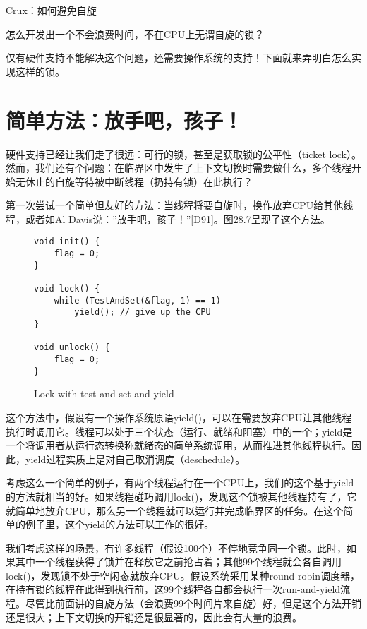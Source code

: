 \begin{tcolorbox}[colframe=grey,colback= grey,arc=0pt,left=6pt,right=6pt,top=6pt,bottom=6pt,boxsep=0pt]
\begin{center}Crux：如何避免自旋\end{center}
怎么开发出一个不会浪费时间，不在CPU上无谓自旋的锁？
\end{tcolorbox}

仅有硬件支持不能解决这个问题，还需要操作系统的支持！下面就来弄明白怎么实现这样的锁。

\section{简单方法：放手吧，孩子！}

硬件支持已经让我们走了很远：可行的锁，甚至是获取锁的公平性（ticket lock）。然而，我们还有个问题：在临界区中发生了上下文切换时需要做什么，多个线程开始无休止的自旋等待被中断线程（扔持有锁）在此执行？

第一次尝试一个简单但友好的方法：当线程将要自旋时，换作放弃CPU给其他线程，或者如Al Davis说：”放手吧，孩子！”[D91]。图28.7呈现了这个方法。

\begin{figure}[h]
\begin{lstlisting}
void init() {
    flag = 0;
}

void lock() {
    while (TestAndSet(&flag, 1) == 1)
        yield(); // give up the CPU
}

void unlock() {
    flag = 0;
}
\end{lstlisting}
\caption{Lock with test-and-set and yield}
\end{figure}

这个方法中，假设有一个操作系统原语yield()，可以在需要放弃CPU让其他线程执行时调用它。线程可以处于三个状态（运行、就绪和阻塞）中的一个；yield是一个将调用者从运行态转换称就绪态的简单系统调用，从而推进其他线程执行。因此，yield过程实质上是对自己取消调度（deschedule）。

考虑这么一个简单的例子，有两个线程运行在一个CPU上，我们的这个基于yield的方法就相当的好。如果线程碰巧调用lock()，发现这个锁被其他线程持有了，它就简单地放弃CPU，那么另一个线程就可以运行并完成临界区的任务。在这个简单的例子里，这个yield的方法可以工作的很好。

我们考虑这样的场景，有许多线程（假设100个）不停地竞争同一个锁。此时，如果其中一个线程获得了锁并在释放它之前抢占着；其他99个线程就会各自调用lock()，发现锁不处于空闲态就放弃CPU。假设系统采用某种round-robin调度器，在持有锁的线程在此得到执行前，这99个线程各自都会执行一次run-and-yield流程。尽管比前面讲的自旋方法（会浪费99个时间片来自旋）好，但是这个方法开销还是很大；上下文切换的开销还是很显著的，因此会有大量的浪费。

